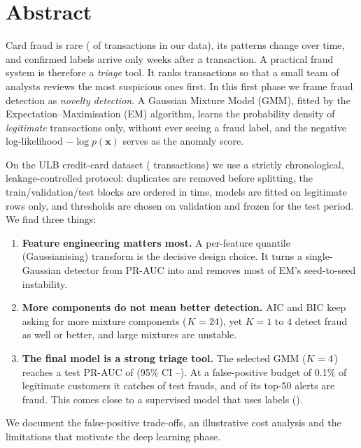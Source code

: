 \documentclass[12pt]{article}
\begin{document}

\section*{Abstract}
Card fraud is rare (\fraudRate{} of transactions in our data), its patterns change over time, and confirmed labels
arrive only weeks after a transaction. A practical fraud system is therefore a \emph{triage} tool. It ranks
transactions so that a small team of analysts reviews the most suspicious ones first. In this first phase we frame
fraud detection as \emph{novelty detection}. A Gaussian Mixture Model (GMM), fitted by the Expectation--Maximisation
(EM) algorithm, learns the probability density of \emph{legitimate} transactions only, without ever seeing a fraud
label, and the negative log-likelihood $-\log p(\mathbf{x})$ serves as the anomaly score.

On the ULB credit-card dataset (\nRowsRaw{} transactions) we use a strictly chronological, leakage-controlled protocol:
duplicates are removed before splitting, the train/validation/test blocks are ordered in time, models are fitted on
legitimate rows only, and thresholds are chosen on validation and frozen for the test period. We find three things:
\begin{enumerate}
\item \textbf{Feature engineering matters most.} A per-feature quantile (Gaussianising) transform is the decisive
design choice. It turns a single-Gaussian detector from PR-AUC \apStd{} into \apKOne{} and removes most of EM's
seed-to-seed instability.
\item \textbf{More components do not mean better detection.} AIC and BIC keep asking for more mixture components
($K=24$), yet $K=1$ to $4$ detect fraud as well or better, and large mixtures are unstable.
\item \textbf{The final model is a strong triage tool.} The selected GMM ($K=4$) reaches a test PR-AUC of
\gmmTestAP{} (95\% CI \gmmCIlo--\gmmCIhi). At a false-positive budget of 0.1\% of legitimate customers it catches
\gmmRecallA{} of test frauds, and \gmmPA{} of its top-50 alerts are fraud. This comes close to a supervised model that
uses labels (\apSup{}).
\end{enumerate}
We document the false-positive trade-offs, an illustrative cost analysis and the limitations that motivate the deep
learning phase.
\end{document}
